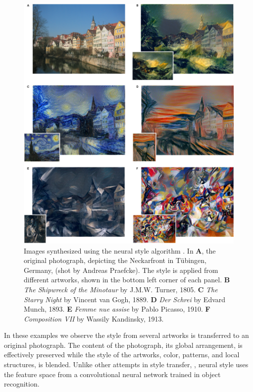 \begin{figure}[!htb]
  \includegraphics[width=\textwidth]{gfx/neural-style-examples}
  \caption{
    Images synthesized using the neural style algorithm \cite{Gatys2015B}.
    In \textbf{A}, the original photograph, depicting the Neckarfront in T\"ubingen, Germany, (shot by Andreas Praefcke).
    The style is applied from different artworks, shown in the bottom left corner of each panel.
    \textbf{B} \emph{The Shipwreck of the Minotaur} by J.M.W. Turner, 1805.
    \textbf{C} \emph{The Starry Night} by Vincent van Gogh, 1889.
    \textbf{D} \emph{Der Schrei} by Edvard Munch, 1893.
    \textbf{E} \emph{Femme nue assise} by Pablo Picasso, 1910.
    \textbf{F} \emph{Composition VII} by Wassily Kandinsky, 1913.
  }
  \label{sub:system:examples}
\end{figure}

In these examples we observe the style from several artworks is transferred to an original photograph.
The content of the photograph, its global arrangement, is effectively preserved while the style of the artworks, color, patterns, and local structures, is blended.
Unlike other attempts in style transfer, , neural style uses the feature space from a convolutional neural network trained in object recognition.


